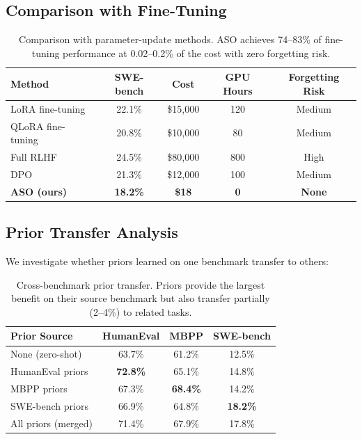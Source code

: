 \documentclass[11pt]{article}
\begin{document}
\subsection{Comparison with Fine-Tuning}

\begin{table}[h]
\centering
\begin{tabular}{lcccc}
\toprule
Method & SWE-bench & Cost & GPU Hours & Forgetting Risk \\
\midrule
LoRA fine-tuning & 22.1\% & \$15{,}000 & 120 & Medium \\
QLoRA fine-tuning & 20.8\% & \$10{,}000 & 80 & Medium \\
Full RLHF & 24.5\% & \$80{,}000 & 800 & High \\
DPO & 21.3\% & \$12{,}000 & 100 & Medium \\
\textbf{ASO (ours)} & \textbf{18.2\%} & \textbf{\$18} & \textbf{0} & \textbf{None} \\
\bottomrule
\end{tabular}
\caption{Comparison with parameter-update methods. ASO achieves 74--83\% of
fine-tuning performance at 0.02--0.2\% of the cost with zero forgetting risk.}
\label{tab:finetuning-comparison}
\end{table}

\subsection{Prior Transfer Analysis}

We investigate whether priors learned on one benchmark transfer to others:

\begin{table}[h]
\centering
\begin{tabular}{lccc}
\toprule
Prior Source & HumanEval & MBPP & SWE-bench \\
\midrule
None (zero-shot) & 63.7\% & 61.2\% & 12.5\% \\
HumanEval priors & \textbf{72.8\%} & 65.1\% & 14.8\% \\
MBPP priors & 67.3\% & \textbf{68.4\%} & 14.2\% \\
SWE-bench priors & 66.9\% & 64.8\% & \textbf{18.2\%} \\
All priors (merged) & 71.4\% & 67.9\% & 17.8\% \\
\bottomrule
\end{tabular}
\caption{Cross-benchmark prior transfer. Priors provide the largest benefit on
their source benchmark but also transfer partially (2--4\%) to related tasks.}
\label{tab:transfer}
\end{table}
\end{document}
